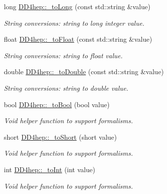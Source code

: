 \begin{DoxyCompactItemize}
long \hyperlink{group___d_d4_h_e_p___g_e_o_m_e_t_r_y_ga76414f0a43017580942c20cd07143439}{DD4hep::\_\-toLong} (const std::string \&value)
\begin{DoxyCompactList}\small\item\em String conversions: string to long integer value. \item\end{DoxyCompactList}\item 
float \hyperlink{group___d_d4_h_e_p___g_e_o_m_e_t_r_y_ga2f50b01d809f29936deacf00abd120be}{DD4hep::\_\-toFloat} (const std::string \&value)
\begin{DoxyCompactList}\small\item\em String conversions: string to float value. \item\end{DoxyCompactList}\item 
double \hyperlink{group___d_d4_h_e_p___g_e_o_m_e_t_r_y_ga76e95737ef946f88e7477f69f677a4e2}{DD4hep::\_\-toDouble} (const std::string \&value)
\begin{DoxyCompactList}\small\item\em String conversions: string to double value. \item\end{DoxyCompactList}\item 
bool \hyperlink{group___d_d4_h_e_p___g_e_o_m_e_t_r_y_ga26bde74c72a880a8a0daa324cc82d423}{DD4hep::\_\-toBool} (bool value)
\begin{DoxyCompactList}\small\item\em Void helper function to support formalisms. \item\end{DoxyCompactList}\item 
short \hyperlink{group___d_d4_h_e_p___g_e_o_m_e_t_r_y_ga08bead9e87f71537d8ef0eebb368b386}{DD4hep::\_\-toShort} (short value)
\begin{DoxyCompactList}\small\item\em Void helper function to support formalisms. \item\end{DoxyCompactList}\item 
int \hyperlink{group___d_d4_h_e_p___g_e_o_m_e_t_r_y_ga9663e908c8754854343673024b109bd4}{DD4hep::\_\-toInt} (int value)
\begin{DoxyCompactList}\small\item\em Void helper function to support formalisms. \item\end{DoxyCompactList}\item 

\end{DoxyCompactItemize}
